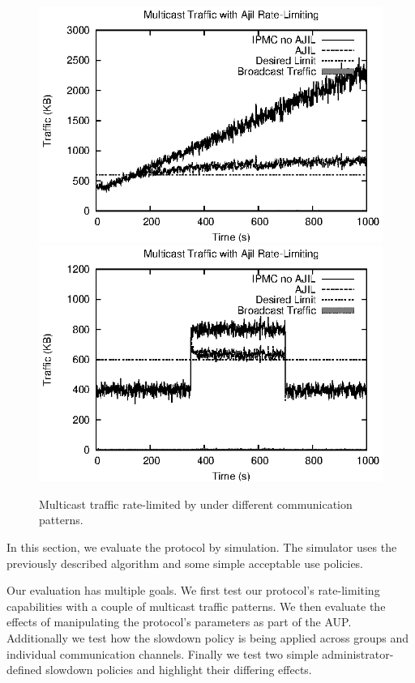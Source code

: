\begin{figure}[ht]
 \centering
 \includegraphics[scale=1]{figures/evaluation/rate-limiting/ajil-linear.eps}
 \includegraphics[scale=1]{figures/evaluation/rate-limiting/ajil-square.eps}
 \caption{Multicast traffic rate-limited by \sysname{} under different communication patterns.}
 \label{fig:rate-limiting}
\end{figure}

In this section, we evaluate the \sysname{} protocol by simulation. The simulator uses the previously described algorithm and some simple acceptable use policies.

Our evaluation has multiple goals. We first test our protocol's rate-limiting capabilities with a couple of multicast traffic patterns. We then evaluate the effects of manipulating the protocol's parameters as part of the AUP. Additionally we test how the slowdown policy is being applied across groups and individual communication channels. Finally we test two simple administrator-defined slowdown policies and highlight their differing effects.

